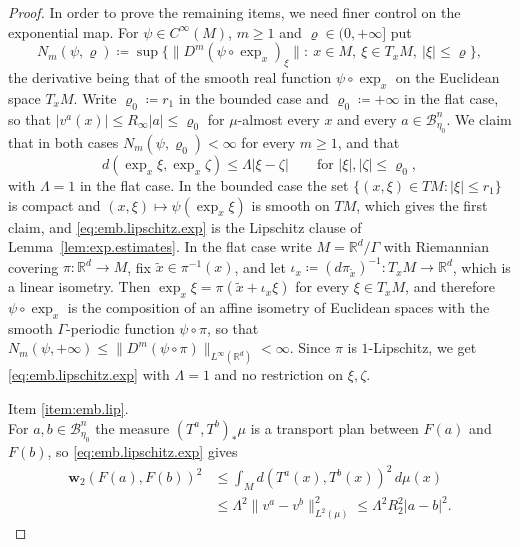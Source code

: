 \documentclass[11pt,reqno]{amsart}
\theoremstyle{plain}
\theoremstyle{definition}
\newcommand{\dw}{\mathbf{w}_2}
\newcommand{\R}{\mathbb{R}}
\begin{document}
\begin{proof}
    In order to prove the remaining items, we need finer control on the exponential map.
    For \( \psi\in C^\infty(M) \), \( m\ge1 \) and \( \varrho\in(0,+\infty] \) put
    \[
        N_m(\psi,\varrho)\coloneqq\sup\Big\{\big\lVert D^m(\psi\circ\exp_x)_\xi\big\rVert:\
        x\in M,\ \xi\in T_xM,\ \lvert\xi\rvert\le\varrho\Big\} ,
    \]
    the derivative being that of the smooth real function \( \psi\circ\exp_x \) on the Euclidean space \( T_xM \).
    Write \( \varrho_0\coloneqq r_1 \) in the bounded case and \( \varrho_0\coloneqq+\infty \) in the flat case, so that \( \lvert v^a(x)\rvert\le R_\infty\lvert a\rvert\le\varrho_0 \) for \( \mu \)-almost every \( x \) and every \( a\in\mathcal B^n_{\eta_0} \).
    We claim that in both cases \( N_m(\psi,\varrho_0)<\infty \) for every \( m\ge1 \), and that
    \begin{equation}\label{eq:emb.lipschitz.exp}
        d\left(\exp_x\xi,\exp_x\zeta\right)\le\Lambda\lvert\xi-\zeta\rvert
        \qquad\text{for }\lvert\xi\rvert,\lvert\zeta\rvert\le\varrho_0 ,
    \end{equation}
    with \( \Lambda=1 \) in the flat case.
    In the bounded case the set \( \{(x,\xi)\in TM:\lvert\xi\rvert\le r_1\} \) is compact and \( (x,\xi)\mapsto\psi(\exp_x\xi) \) is smooth on \( TM \), which gives the first claim, and \eqref{eq:emb.lipschitz.exp} is the Lipschitz clause of Lemma~\ref{lem:exp.estimates}.
    In the flat case write \( M=\R^d/\Gamma \) with Riemannian covering \( \pi:\R^d\to M \), fix \( \tilde x\in\pi^{-1}(x) \), and let \( \iota_x\coloneqq(d\pi_{\tilde x})^{-1}:T_xM\to\R^d \), which is a linear isometry.
    Then \( \exp_x\xi=\pi(\tilde x+\iota_x\xi) \) for every \( \xi\in T_xM \), and therefore \( \psi\circ\exp_x \) is the composition of an affine isometry of Euclidean spaces with the smooth \( \Gamma \)-periodic function \( \psi\circ\pi \), so that \( N_m(\psi,+\infty)\le\lVert D^m(\psi\circ\pi)\rVert_{L^\infty(\R^d)}<\infty \).
    Since \( \pi \) is \( 1 \)-Lipschitz, we get \eqref{eq:emb.lipschitz.exp} with \( \Lambda=1 \) and no restriction on \( \xi,\zeta \).

    \medskip
    \noindent Item \ref{item:emb.lip}. \\
    For \( a,b\in\mathcal B^n_{\eta_0} \) the measure \( (T^a,T^b)_\ast\mu \) is a transport plan between \( F(a) \) and \( F(b) \), so \eqref{eq:emb.lipschitz.exp} gives
    \[
    \begin{split}
        \dw\left(F(a),F(b)\right)^2 &\le \int_Md\left(T^a(x),T^b(x)\right)^2\,d\mu(x) \\
                                 &\le\Lambda^2\lVert v^a-v^b\rVert^2_{L^2(\mu)}\le\Lambda^2R_2^2\lvert a-b\rvert^2 .
    \end{split}
    \]


\end{proof}
\end{document}
